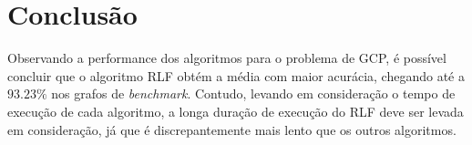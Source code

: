 \documentclass[10pt, twocolumn]{article}
\begin{document}


\section{Conclusão}
Observando a performance dos algoritmos para o problema de GCP, é possível concluir
que o algoritmo RLF obtém a média com maior acurácia, chegando até a $93.23\%$ nos
grafos de \emph{benchmark}. Contudo, levando em consideração o tempo de execução
de cada algoritmo, a longa duração de execução do RLF deve ser levada em consideração,
já que é discrepantemente mais lento que os outros algoritmos.





\end{document}
